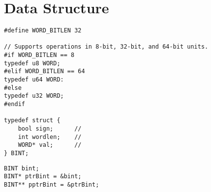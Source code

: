 \documentclass[12pt,openany]{book}
\theoremstyle{definition}
\begin{document}
	\section{Data Structure}
	\begin{lstlisting}[style=C, caption={},captionpos=t]
#define WORD_BITLEN 32

// Supports operations in 8-bit, 32-bit, and 64-bit units.
#if WORD_BITLEN == 8
typedef u8 WORD;
#elif WORD_BITLEN == 64
typedef u64 WORD:
#else
typedef u32 WORD;
#endif

typedef struct {
	bool sign;      // 
	int wordlen;    //
	WORD* val;      // 
} BINT;
	\end{lstlisting}
	\vspace{30pt}
	\begin{lstlisting}[style=C, caption={},captionpos=t]
BINT bint;
BINT* ptrBint = &bint;
BINT** pptrBint = &ptrBint;
	\end{lstlisting}
\end{document}

